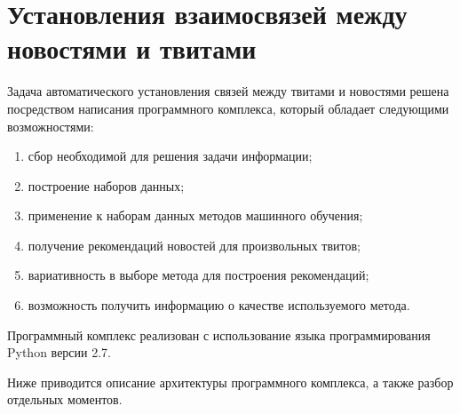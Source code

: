 \section{Установления взаимосвязей между новостями и твитами}
    Задача автоматического установления связей между твитами и новостями решена посредством написания программного комплекса,
    который обладает следующими возможностями:
    \begin{enumerate}
        \item сбор необходимой для решения задачи информации;
        \item построение наборов данных;
        \item применение к наборам данных методов машинного обучения;
        \item получение рекомендаций новостей для произвольных твитов;
        \item вариативность в выборе метода для построения рекомендаций;
        \item возможность получить информацию о качестве используемого метода.
    \end{enumerate}
    Программный комплекс реализован с использование языка программирования Python версии 2.7.

    Ниже приводится описание архитектуры программного комплекса, а также разбор отдельных моментов.

    
    
    
    
    

